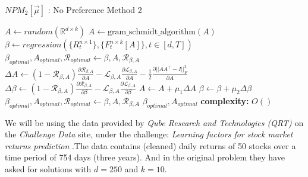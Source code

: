 \begin{algorithm}[H]
\caption{$NPM_2[\vec{\mu}]$ : No Preference Method 2}\label{no_preference_method_2}
\begin{algorithmic}[1]
\State $A \gets random(\mathbb{R}^{d\times k})$
\State $A \gets \text{gram\_schmidt\_algorithm}(A)$
\State $\beta \gets regression(\{R^{n\times 1}_{t}\},\{F^{n\times k}_{t}[A]\}, t\in [d,T])$
\State $\beta_{optimal}, A_{optimal}, \mathcal{R}_{optimal} \gets \beta, A, \mathcal{R}_{\beta, A}$
    \State $\Delta A \gets (1-\mathcal{R}_{\beta, A})\frac{\partial \mathcal{R}_{\beta, A}}{\partial A} - \mathcal{L}_{\beta, A} \frac{\partial \mathcal{L}_{\beta, A}}{\partial A}- \frac{1}{2}\frac{\partial ||AA^\top -I||^2_F}{\partial A} $
    \State $\Delta \beta \gets (1-\mathcal{R}_{\beta, A})\frac{\partial \mathcal{R}_{\beta, A}}{\partial \beta} - \mathcal{L}_{\beta, A} \frac{\partial \mathcal{L}_{\beta, A}}{\partial \beta} $
    \State $A \gets A + \mu_1 \Delta A$
    \State $\beta \gets \beta + \mu_2 \Delta \beta$
      
        \State $\beta_{optimal}, A_{optimal}, \mathcal{R}_{optimal} \gets \beta, A, \mathcal{R}_{\beta, A} $
    \EndIf 
\EndFor
\State \Return  $\beta_{optimal}, A_{optimal}$
\State \textbf{complexity: } $O()$
\end{algorithmic}
\end{algorithm}

\newpage
{}
We will be using the data provided by \textit{Qube Research and Technologies (QRT)} on the \textit{Challenge Data} site, under the challenge: \textit{Learning factors for stock market returns prediction} \cite{qrt_challenge}.\newline The data contains (cleaned) daily returns of 50 stocks over a time period of 754 days (three years). And in the original problem they have asked for solutions with $d=250$ and $k=10$.

